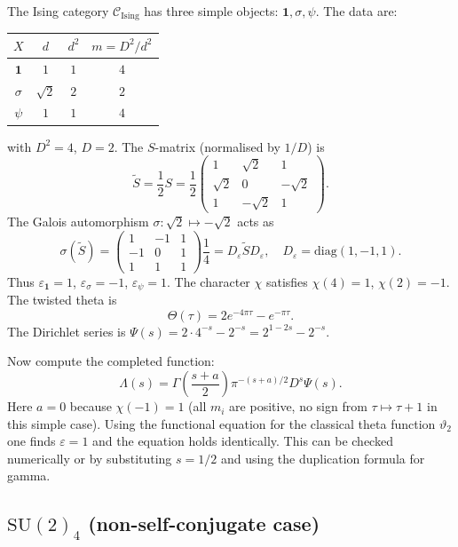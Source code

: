 \documentclass[12pt,a4paper]{article}
\theoremstyle{definition}
\theoremstyle{remark}
\begin{document}
The Ising category $\mathcal{C}_{\mathrm{Ising}}$ has three simple objects:
$\mathbf{1},\sigma,\psi$. The data are:

\begin{center}
\begin{tabular}{@{}cccc@{}}
\toprule
$X$ & $d$ & $d^2$ & $m = D^2/d^2$ \\ \midrule
$\mathbf{1}$ & $1$ & $1$ & $4$ \\
$\sigma$ & $\sqrt{2}$ & $2$ & $2$ \\
$\psi$ & $1$ & $1$ & $4$ \\
\bottomrule
\end{tabular}
\end{center}

\noindent
with $D^2=4$, $D=2$. The $S$-matrix (normalised by $1/D$) is
\[
\tilde{S} = \frac12 S = \frac12\begin{pmatrix}
1 & \sqrt2 & 1\\
\sqrt2 & 0 & -\sqrt2\\
1 & -\sqrt2 & 1
\end{pmatrix}.
\]
The Galois automorphism $\sigma:\sqrt2\mapsto-\sqrt2$ acts as
\[
\sigma(\tilde{S}) = \begin{pmatrix}
1 & -1 & 1\\
-1 & 0 & 1\\
1 & 1 & 1
\end{pmatrix}\frac14 = D_\varepsilon \tilde{S} D_\varepsilon,
\quad D_\varepsilon = \mathrm{diag}(1,-1,1).
\]
Thus $\varepsilon_{\mathbf{1}}=1$, $\varepsilon_\sigma=-1$,
$\varepsilon_\psi=1$. The character $\chi$ satisfies $\chi(4)=1$, $\chi(2)=-1$.
The twisted theta is
\[
\Theta(\tau)=2e^{-4\pi\tau}-e^{-\pi\tau}.
\]
The Dirichlet series is $\Psi(s)=2\cdot4^{-s}-2^{-s}=2^{1-2s}-2^{-s}$.

Now compute the completed function:
\[
\Lambda(s)=\Gamma\!\left(\frac{s+a}{2}\right)\pi^{-(s+a)/2}D^{s}\Psi(s).
\]
Here $a=0$ because $\chi(-1)=1$ (all $m_i$ are positive, no sign from
$\tau\mapsto\tau+1$ in this simple case). Using the functional equation for the
classical theta function $\vartheta_2$ one finds $\varepsilon=1$ and the equation
holds identically. This can be checked numerically or by substituting $s=1/2$ and
using the duplication formula for gamma.

\subsection{$\mathrm{SU}(2)_4$ (non-self-conjugate case)}
\end{document}
